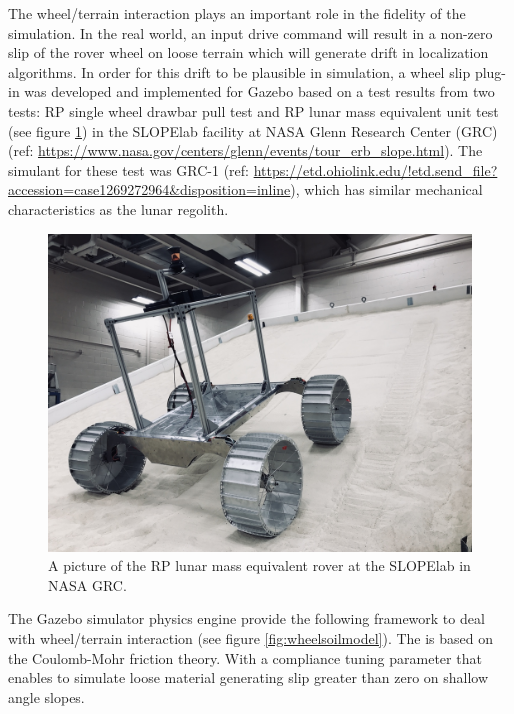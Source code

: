 \documentclass[twocolumn,letterpaper]{IEEEAerospaceCLS}  %
\begin{document}
The wheel/terrain interaction plays an important role in the fidelity of the simulation. In the real world, an input drive command will result in a non-zero slip of the rover wheel on loose terrain which will generate drift in localization algorithms. In order for this drift to be plausible in simulation, a wheel slip plug-in was developed and implemented for Gazebo based on a test results from two tests: RP single wheel drawbar pull test and RP lunar mass equivalent unit test (see figure \ref{fig:mgru}) in the SLOPElab facility at NASA Glenn Research Center (GRC) (ref: \url{https://www.nasa.gov/centers/glenn/events/tour_erb_slope.html}). The simulant for these test was GRC-1 (ref: \url{https://etd.ohiolink.edu/!etd.send_file?accession=case1269272964&disposition=inline}), which has similar mechanical characteristics as the lunar regolith. 
\begin{figure}[h!]
	\includegraphics[width=\columnwidth]{figures/wheel_slip_MGRU.JPG}
   	\caption{A picture of the RP lunar mass equivalent rover at the SLOPElab in NASA GRC.}
    \label{fig:mgru}
\end{figure}
The Gazebo simulator physics engine provide the following framework to deal with wheel/terrain interaction (see figure \ref{fig:wheelsoilmodel}). The is based on the Coulomb-Mohr friction theory. With a compliance tuning parameter that enables to simulate loose material generating slip greater than zero on shallow angle slopes.
\end{document}
